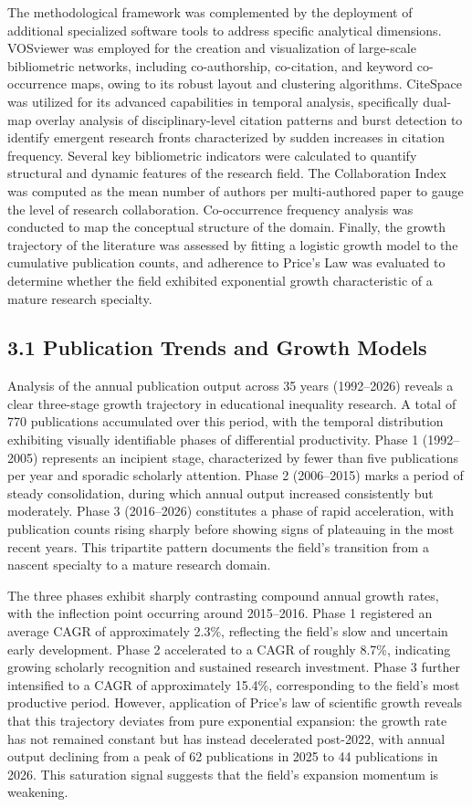 \documentclass[12pt,a4paper]{article}
\begin{document}
The methodological framework was complemented by the deployment of additional specialized software tools to address specific analytical dimensions. VOSviewer was employed for the creation and visualization of large-scale bibliometric networks, including co-authorship, co-citation, and keyword co-occurrence maps, owing to its robust layout and clustering algorithms. CiteSpace was utilized for its advanced capabilities in temporal analysis, specifically dual-map overlay analysis of disciplinary-level citation patterns and burst detection to identify emergent research fronts characterized by sudden increases in citation frequency. Several key bibliometric indicators were calculated to quantify structural and dynamic features of the research field. The Collaboration Index was computed as the mean number of authors per multi-authored paper to gauge the level of research collaboration. Co-occurrence frequency analysis was conducted to map the conceptual structure of the domain. Finally, the growth trajectory of the literature was assessed by fitting a logistic growth model to the cumulative publication counts, and adherence to Price's Law was evaluated to determine whether the field exhibited exponential growth characteristic of a mature research specialty.

\subsection{3.1 Publication Trends and Growth Models}

Analysis of the annual publication output across 35 years (1992–2026) reveals a clear three-stage growth trajectory in educational inequality research. A total of 770 publications accumulated over this period, with the temporal distribution exhibiting visually identifiable phases of differential productivity. Phase 1 (1992–2005) represents an incipient stage, characterized by fewer than five publications per year and sporadic scholarly attention. Phase 2 (2006–2015) marks a period of steady consolidation, during which annual output increased consistently but moderately. Phase 3 (2016–2026) constitutes a phase of rapid acceleration, with publication counts rising sharply before showing signs of plateauing in the most recent years. This tripartite pattern documents the field's transition from a nascent specialty to a mature research domain.

The three phases exhibit sharply contrasting compound annual growth rates, with the inflection point occurring around 2015–2016. Phase 1 registered an average CAGR of approximately 2.3\%, reflecting the field's slow and uncertain early development. Phase 2 accelerated to a CAGR of roughly 8.7\%, indicating growing scholarly recognition and sustained research investment. Phase 3 further intensified to a CAGR of approximately 15.4\%, corresponding to the field's most productive period. However, application of Price's law of scientific growth reveals that this trajectory deviates from pure exponential expansion: the growth rate has not remained constant but has instead decelerated post-2022, with annual output declining from a peak of 62 publications in 2025 to 44 publications in 2026. This saturation signal suggests that the field's expansion momentum is weakening.
\end{document}
